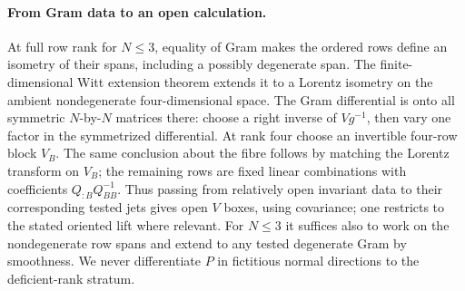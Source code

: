 \paragraph{From Gram data to an open calculation.}
At full row rank for \(N\le3\), equality of Gram makes the ordered rows define an isometry of their spans, including a possibly degenerate span. The finite-dimensional Witt extension theorem extends it to a Lorentz isometry on the ambient nondegenerate four-dimensional space. The Gram differential is onto all symmetric \(N\)-by-\(N\) matrices there: choose a right inverse of \(V g^{-1}\), then vary one factor in the symmetrized differential. At rank four choose an invertible four-row block \(V_B\). The same conclusion about the fibre follows by matching the Lorentz transform on \(V_B\); the remaining rows are fixed linear combinations with coefficients \(Q_{:B}Q_{BB}^{-1}\). Thus passing from relatively open invariant data to their corresponding tested jets gives open \(V\) boxes, using covariance; one restricts to the stated oriented lift where relevant. For \(N\le3\) it suffices also to work on the nondegenerate row spans and extend to any tested degenerate Gram by smoothness. We never differentiate \(P\) in fictitious normal directions to the deficient-rank stratum.

